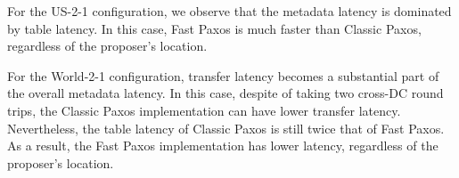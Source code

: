 %
%

%

For the US-2-1 configuration, we observe that the metadata latency is dominated
by table latency. In this case, Fast Paxos is much faster than Classic Paxos,
regardless of the proposer's location.

For the World-2-1 configuration, transfer latency becomes a substantial part of
the overall metadata latency. In this case, despite of taking two cross-DC round
trips, the Classic Paxos implementation can have lower transfer latency.
Nevertheless, the table latency of Classic Paxos is still twice that of Fast
Paxos. As a result, the Fast Paxos implementation has lower latency, regardless
of the proposer's location.

